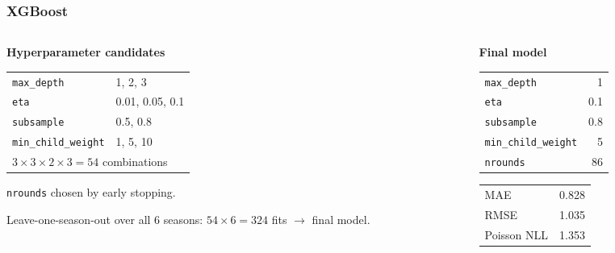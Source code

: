 \documentclass{beamer}
\begin{document}
\begin{frame}
  \frametitle{XGBoost}

  \begin{columns}[T]

    \begin{column}{0.48\textwidth}
      \textbf{Hyperparameter candidates}

      \vspace{0.4em}
      \footnotesize
      \begin{tabular}{ll}
        \toprule
        \texttt{max\_depth}         & 1, 2, 3 \\
        \texttt{eta}                & 0.01, 0.05, 0.1 \\
        \texttt{subsample}          & 0.5, 0.8 \\
        \texttt{min\_child\_weight} & 1, 5, 10 \\
        \midrule
        \multicolumn{2}{l}{$3 \times 3 \times 2 \times 3 = 54$ combinations} \\
        \bottomrule
      \end{tabular}

      \vspace{0.8em}
      \scriptsize
      \texttt{nrounds} chosen by early stopping.

      \vspace{0.4em}
      Leave-one-season-out over all 6 seasons:
      $54 \times 6 = 324$ fits $\rightarrow$ final model.
    \end{column}

    \begin{column}{0.48\textwidth}
      \textbf{Final model}

      \vspace{0.4em}
      \footnotesize
      \begin{tabular}{lr}
        \toprule
        \texttt{max\_depth}         & 1 \\
        \texttt{eta}                & 0.1 \\
        \texttt{subsample}          & 0.8 \\
        \texttt{min\_child\_weight} & 5 \\
        \texttt{nrounds}            & 86 \\
        \bottomrule
      \end{tabular}

      \vspace{0.8em}
      \footnotesize
      \begin{tabular}{lr}
        \toprule
        MAE         & 0.828 \\
        RMSE        & 1.035 \\
        Poisson NLL & 1.353 \\
        \bottomrule
      \end{tabular}


\end{column}
\end{columns}
\end{frame}
\end{document}
